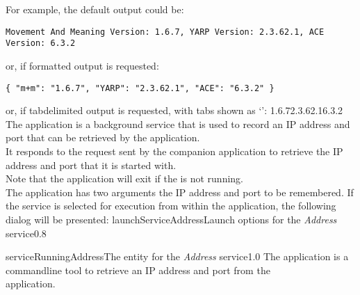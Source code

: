 \insertFullUtilityParameters{}
For example, the default output could be:
\outputBegin
\begin{verbatim}
Movement And Meaning Version: 1.6.7, YARP Version: 2.3.62.1, ACE Version: 6.3.2
\end{verbatim}
\outputEnd{}
or, if \json\longDash{}formatted output is requested:
\outputBegin
\begin{verbatim}
{ "m+m": "1.6.7", "YARP": "2.3.62.1", "ACE": "6.3.2" }
\end{verbatim}
\outputEnd{}
or, if tab\longDash{}delimited output is requested, with tabs shown as `\tabSymbol':
\outputBegin{}
1.6.7\pseudotab{}2.3.62.1\pseudotab{}6.3.2
\outputEnd
{}
\secondaryEnd
\condPage
{}
The  application is a background service that is used to
record an IP address and port that can be retrieved by the 
application.\\

It responds to the  request sent by the
companion application  to retrieve the IP address and port
that it is started with.\\

Note that the application will exit if the  is not
running.\\

The application has two arguments \longDash{} the IP address and port to be remembered.
\insertAutoAppParameters
{}
\condPage
If the service is selected for execution from within the \emph{\MMMU} application, the
following dialog will be presented:
%
{launchServiceAddress}{Launch options for the \emph{Address} service}{0.8}

%
{serviceRunningAddress}{The \emph{\MMMU} entity for the \emph{Address} service}{1.0}
\condPage
{}
The  application is a command\longDash{}line tool to
retrieve an IP address and port from the\\
 application.\\

